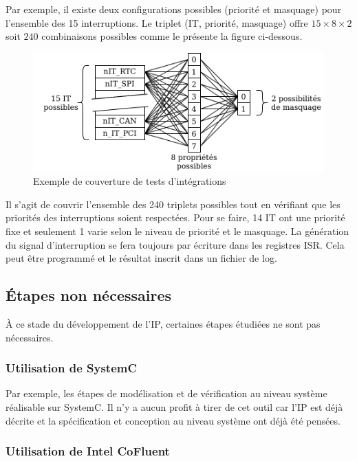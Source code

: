 Par exemple, il existe deux configurations possibles (priorité et masquage) pour l'ensemble des 15 interruptions.
Le triplet (IT, priorité, masquage) offre $15\times8\times2$ soit $240$ combinaisons possibles comme le présente la figure ci-dessous.

\begin{figure}[h!]
	\centering
	\includegraphics[width=0.7\linewidth]{figure/combinaisons_integration.png}
	\caption{Exemple de couverture de tests d'intégrations}
	\label{fig:combinaisons_integration}
\end{figure}

Il s'agit de couvrir l'ensemble des 240 triplets possibles tout en vérifiant que les priorités des interruptions soient respectées. 
Pour se faire, 14 IT ont une priorité fixe et seulement 1 varie selon le niveau de priorité et le masquage.
La génération du signal d'interruption se fera toujours par écriture dans les registres ISR.
Cela peut être programmé et le résultat inscrit dans un fichier de log.

\subsection{Étapes non nécessaires}

À ce stade du développement de l'IP, certaines étapes étudiées ne sont pas nécessaires.

\subsubsection*{Utilisation de SystemC}

Par exemple, les étapes de modélisation et de vérification au niveau système réalisable sur SystemC.
Il n'y a aucun profit à tirer de cet outil car l'IP est déjà décrite et la spécification et conception au niveau système ont déjà été pensées.

\subsubsection*{Utilisation de Intel CoFluent}

